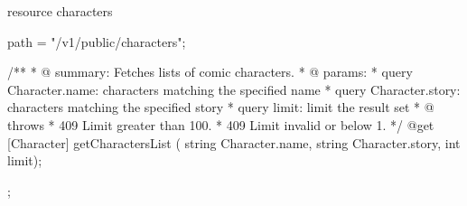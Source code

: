 resource characters  { 
     path = "/v1/public/characters"; 
    
      /**
      * @ summary: Fetches lists of comic characters.
      * @ params:
      *       query Character.name: characters matching the specified name
      *       query Character.story: characters matching the specified story
      *       query limit: limit the result set 
      * @ throws
      *       409  Limit greater than 100.
      *       409  Limit invalid or below 1.
      */
      @get    [Character] getCharactersList ( string Character.name, string Character.story,
                           	                 int limit);
     
 };